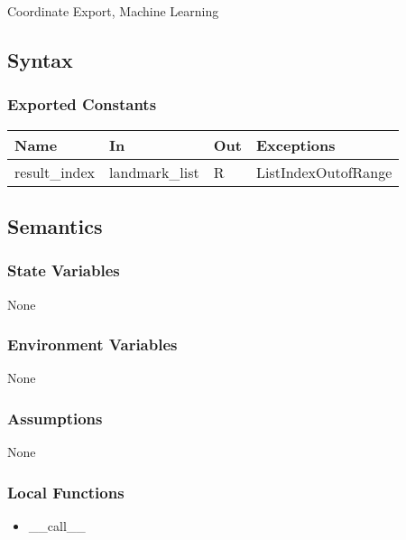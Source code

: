 \documentclass[12pt, titlepage]{article}
\begin{document}
Coordinate Export, Machine Learning\\

\subsection{Syntax}

\subsubsection{Exported Constants}

\begin{center}
\begin{tabular}{p{5cm} p{3cm} p{3cm} p{4cm}}
\hline
\textbf{Name} & \textbf{In} & \textbf{Out} & \textbf{Exceptions} \\
\hline
result\_index & landmark_list & R & ListIndexOutofRange \\
\hline
\end{tabular}
\end{center}

\subsection{Semantics}

\subsubsection{State Variables}

None\\

\subsubsection{Environment Variables}

None\\

\subsubsection{Assumptions}

None\\

\subsubsection{Local Functions}
\begin{itemize}
\item \_\_call\_\_
\end{itemize}
\end{document}
